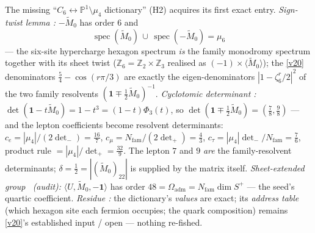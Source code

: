 \documentclass[11pt,a4paper]{article}
\newcommand{\Nfam}{N_{\mathrm{fam}}}
\newcommand{\PP}{\mathbb P^1}
\newcommand{\Z}{\mathbb Z}
\begin{document}
\begin{keybox}
The missing ``$C_6\leftrightarrow\PP\setminus\mu_4$ dictionary'' (H2) acquires its first exact entry.
\emph{Sign-twist lemma \mE:} $-\widetilde M_0$ has order $6$ and
\[
  \boxed{\ \operatorname{spec}(\widetilde M_0)\,\cup\,\operatorname{spec}(-\widetilde M_0)=\mu_6\ }
\]
--- the six-site hypercharge hexagon spectrum \emph{is} the family monodromy spectrum together with its
sheet twist ($\Z_6=\Z_2\times\Z_3$ realised as $(-1)\times\langle\widetilde M_0\rangle$); the \vref{v20}
denominators $\tfrac54-\cos(r\pi/3)$ are exactly the eigen-denominators $|1-\zeta_6^r/2|^2$ of the two
family resolvents $(\mathbf1\mp\tfrac12\widetilde M_0)^{-1}$. \emph{Cyclotomic determinant \mE:}
$\det(\mathbf1-t\widetilde M_0)=1-t^3=(1-t)\Phi_3(t)$, so $\det(\mathbf1\mp\tfrac12\widetilde M_0)=
(\tfrac78,\tfrac98)$ --- and the lepton coefficients become resolvent determinants:
$c_e=|\mu_4|/(2\det_-)=\tfrac{16}7$, $c_\mu=\Nfam/(2\det_+)=\tfrac43$,
$c_\tau=|\mu_4|\det_-/\Nfam=\tfrac76$, product rule $=|\mu_4|/\det_+=\tfrac{32}9$. The lepton $7$ and
$9$ \emph{are} the family-resolvent determinants; $\delta=\tfrac12=|(\widetilde M_0)_{22}|$ is supplied
by the matrix itself. \emph{Sheet-extended group \mE\ (audit):} $\langle U,\widetilde M_0,-\mathbf1\rangle$
has order $48=\Omega_{\mathrm{adm}}=\Nfam\dim S^+$ --- the seed's quartic coefficient. \emph{Residue \mC:} the
dictionary's \emph{values} are exact; its \emph{address table} (which hexagon site each fermion
occupies; the quark composition) remains \vref{v20}'s established input / open --- nothing re-fished.
\end{keybox}
\end{document}
